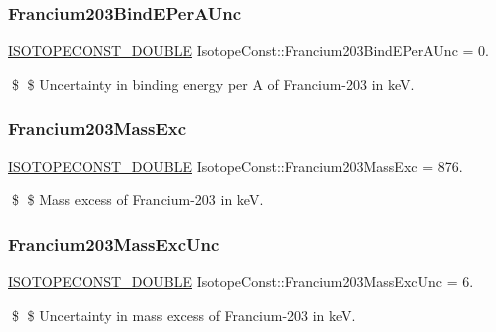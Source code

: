\subsubsection{\texorpdfstring{Francium203\+Bind\+E\+Per\+A\+Unc}{Francium203BindEPerAUnc}}
{\footnotesize\ttfamily \mbox{\hyperlink{group___isotope_const-_macros_ga8f45a7272ce02c0b4c65c44636ed719a}{I\+S\+O\+T\+O\+P\+E\+C\+O\+N\+S\+T\+\_\+\+D\+O\+U\+B\+LE}} Isotope\+Const\+::\+Francium203\+Bind\+E\+Per\+A\+Unc = 0.}

\$ \$ Uncertainty in binding energy per A of Francium-\/203 in keV. \mbox{\label{group___isotope_const-_francium-_fr203_ga03426f40b825a8c1ce73a4ef76c8addf}} 
\subsubsection{\texorpdfstring{Francium203\+Mass\+Exc}{Francium203MassExc}}
{\footnotesize\ttfamily \mbox{\hyperlink{group___isotope_const-_macros_ga8f45a7272ce02c0b4c65c44636ed719a}{I\+S\+O\+T\+O\+P\+E\+C\+O\+N\+S\+T\+\_\+\+D\+O\+U\+B\+LE}} Isotope\+Const\+::\+Francium203\+Mass\+Exc = 876.}

\$ \$ Mass excess of Francium-\/203 in keV. \mbox{\label{group___isotope_const-_francium-_fr203_ga011f709b187accc606aa162d5a340af9}} 
\subsubsection{\texorpdfstring{Francium203\+Mass\+Exc\+Unc}{Francium203MassExcUnc}}
{\footnotesize\ttfamily \mbox{\hyperlink{group___isotope_const-_macros_ga8f45a7272ce02c0b4c65c44636ed719a}{I\+S\+O\+T\+O\+P\+E\+C\+O\+N\+S\+T\+\_\+\+D\+O\+U\+B\+LE}} Isotope\+Const\+::\+Francium203\+Mass\+Exc\+Unc = 6.}

\$ \$ Uncertainty in mass excess of Francium-\/203 in keV. \mbox{\label{group___isotope_const-_francium-_fr203_gad7ee8d098b88aaffd51dc0aad5d75004}} 

